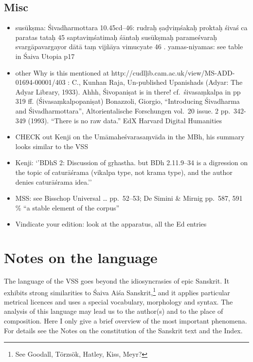 \documentclass[12pt]{book}
\begin{document}
{%
\subsection{Misc}\label{misc}}

\begin{itemize}
\item
  susūkṣma: Śivadharmottara 10.45cd--46: rudraḥ ṣaḍviṃśakaḥ proktaḥ
  śivaś ca paratas tataḥ \textbar{}\textbar{} 45 \textbar{}\textbar{}
  saptaviṃśatimaḥ śāntaḥ susūkṣmaḥ parameśvaraḥ \textbar{}
  svargāpavargayor dātā taṃ vijñāya vimucyate \textbar{}\textbar{} 46
  \textbar{}\textbar{}. yamas-niyamas: see table in Śaiva Utopia p17
\item
  other Why is this mentioned at
  http://cudlḷib.cam.ac.uk/view/MS-ADD-01694-00001/403 : C., Kunhan
  Raja, Un-published Upanishads (Adyar: The Adyar Library, 1933). Ahhh,
  Śivopaniṣat is in there! cf.~śivasaṃkalpa in pp 319 ff.
  (Śivasaṃkalpopaniṣat) Bonazzoli, Giorgio, ``Introducing Śivadharma and
  Śivadharmottara'', Altorientalische Forschungen vol.~20 issue. 2
  pp.~342-349 (1993). ``There is no raw data.'' EdX Harvard Digital
  Humanities
\item
  CHECK out Kenji on the Umāmaheśvarasaṃvāda in the MBh, his summary
  looks similar to the VSS
\item
  Kenji: `'BDhS 2: Discussion of gṛhastha. but BDh 2.11.9--34 is a
  digression on the topic of caturāśrama (vikalpa type, not krama type),
  and the author denies caturāśrama idea.''
\item
  MSS: see Bisschop Universal \ldots{} pp.~52--53; De Simini \& Mirnig
  pp.~587, 591 \% ``a stable element of the corpus''
\item
  Vindicate your edition: look at the apparatus, all the Ed entries
\end{itemize}

{%
\section{Notes on the language}\label{notes-on-the-language}}

The language of the VSS goes beyond the idiosyncrasies of epic Sanskrit.
It exhibits strong similarities to Śaiva Aiśa Sanskrit,\footnote{See
  Goodall, Törzsök, Hatley, Kiss, Meyr?} and it applies particular
metrical licences and uses a special vocabulary, morphology and syntax.
The analysis of this language may lead us to the author(s) and to the
place of composition. Here I only give a brief overview of the most
important phenomena. For details see the Notes on the constitution of
the Sanskrit text and the Index.
\end{document}
